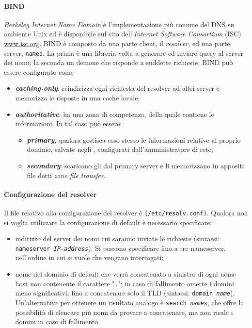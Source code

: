 \documentclass[a4paper, twoside]{article}
\def\code#1{\texttt{#1}}
\def\vedi#1{\nameref{#1}}
\def\italic#1{\textit{#1}}
\begin{document}
\paragraph{BIND} \textit{Berkeley Internet Name Domain} è l'implementazione più comune del DNS su ambiente Unix ed è disponibile sul sito dell'\italic{Internet Software Consortium} (ISC) \url{www.isc.org}. BIND è composto da una parte client, il \textit{resolver}, ed una parte server, \code{named}. La prima è una libreria volta a generare ed inviare query al server dei nomi; la seconda un demone che risponde a suddette richieste. 
BIND può essere configurato come 
\begin{itemize}
\item \italic{\textbf{caching-only}}: reindirizza ogni richiesta del resolver ad altri server e memorizza le risposte in una cache locale;
\item \textbf{\textit{authoritative}}: ha una zona di competenza, della quale contiene le informazioni. In tal caso può essere: 
\begin{itemize}
\item \italic{\textbf{primary}}, qualora gestisca esso stesso le informazioni relative al proprio dominio, salvate negli \vedi{Zone file}, configurati dall'amministratore di rete,
\item \italic{\textbf{secondary}}: scaricano gli \vedi{Zone file} dal primary server e li memorizzano in appositi file detti \italic{zone file transfer}.
\end{itemize}
\end{itemize}
\paragraph{Configurazione del resolver} Il file relativo alla configurazione del resolver è \code{(/etc/resolv.conf)}. Qualora non si voglia utilizzare la configurazione di default è necessario specificare:
\begin{itemize}
\item indirizzo del server dei nomi cui saranno inviate le richieste (sintassi: \code{nameserver \textit{IP-address}}). Si possono specificare fino a tre nameserver, nell'ordine in cui si vuole che vengano interrogati;
\item nome del dominio di default che verrà concatenato a sinistra di ogni nome host non contenente il carattere "\code{.}"; in caso di fallimento omette i domini meno significativi, fino a concatenare solo il TLD (sintassi: \code{domain \textit{name}}). Un'alternativa per ottenere un risultato analogo è \code{search \textit{names}}, che offre la possibilità di elencare più nomi da provare a concatenare, ma non risale i domini in caso di fallimento.
\end{itemize}
\end{document}
